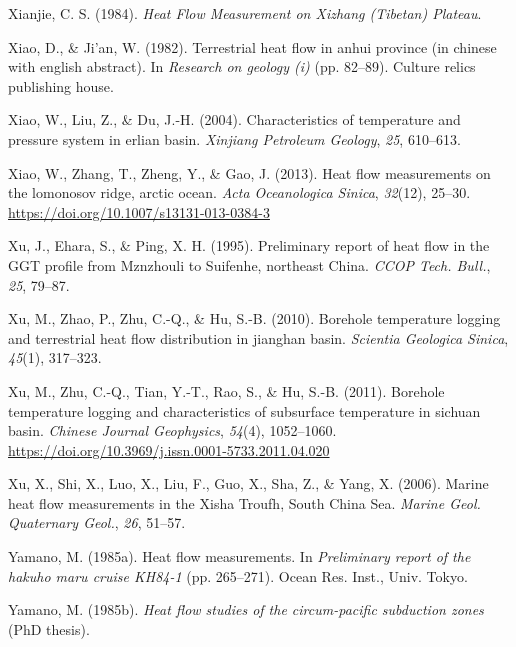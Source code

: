 \begin{CSLReferences}{1}{1}
\leavevmode{}%
Xianjie, C. S. (1984). \emph{Heat Flow Measurement on Xizhang (Tibetan) Plateau}.

\leavevmode{}%
Xiao, D., \& Ji'an, W. (1982). Terrestrial heat flow in anhui province (in chinese with english abstract). In \emph{Research on geology (i)} (pp. 82--89). Culture relics publishing house.

\leavevmode{}%
Xiao, W., Liu, Z., \& Du, J.-H. (2004). Characteristics of temperature and pressure system in erlian basin. \emph{Xinjiang Petroleum Geology}, \emph{25}, 610--613.

\leavevmode{}%
Xiao, W., Zhang, T., Zheng, Y., \& Gao, J. (2013). Heat flow measurements on the lomonosov ridge, arctic ocean. \emph{Acta Oceanologica Sinica}, \emph{32}(12), 25--30. \url{https://doi.org/10.1007/s13131-013-0384-3}

\leavevmode{}%
Xu, J., Ehara, S., \& Ping, X. H. (1995). Preliminary report of heat flow in the {GGT} profile from {Mznzhouli to Suifenhe, northeast China}. \emph{CCOP Tech. Bull.}, \emph{25}, 79--87.

\leavevmode{}%
Xu, M., Zhao, P., Zhu, C.-Q., \& Hu, S.-B. (2010). Borehole temperature logging and terrestrial heat flow distribution in jianghan basin. \emph{Scientia Geologica Sinica}, \emph{45}(1), 317--323.

\leavevmode{}%
Xu, M., Zhu, C.-Q., Tian, Y.-T., Rao, S., \& Hu, S.-B. (2011). Borehole temperature logging and characteristics of subsurface temperature in sichuan basin. \emph{Chinese Journal Geophysics}, \emph{54}(4), 1052--1060. \url{https://doi.org/10.3969/j.issn.0001-5733.2011.04.020}

\leavevmode{}%
Xu, X., Shi, X., Luo, X., Liu, F., Guo, X., Sha, Z., \& Yang, X. (2006). Marine heat flow measurements in the {Xisha Troufh, South China Sea}. \emph{Marine Geol. Quaternary Geol.}, \emph{26}, 51--57.

\leavevmode{}%
Yamano, M. (1985a). Heat flow measurements. In \emph{Preliminary report of the hakuho maru cruise KH84-1} (pp. 265--271). Ocean Res. Inst., Univ. Tokyo.

\leavevmode{}%
Yamano, M. (1985b). \emph{Heat flow studies of the circum-pacific subduction zones} (PhD thesis).


\end{CSLReferences}
